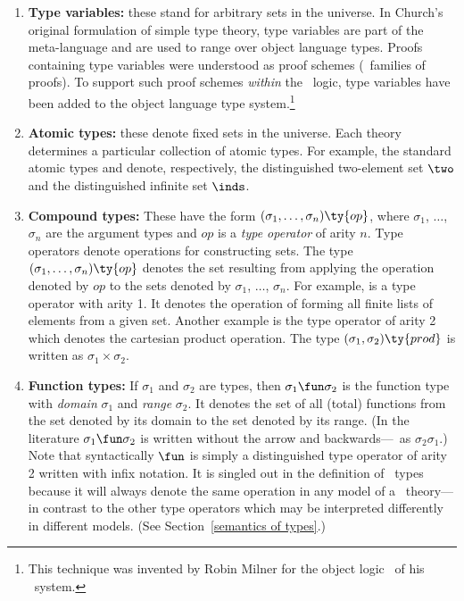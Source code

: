 \begin{enumerate}

\item {\bf Type variables:} these stand for arbitrary
sets in the universe.  In Church's original formulation of simple type
theory, type variables are part of the meta-language and are used to
range over object language types.  Proofs containing type variables
were understood as proof schemes (\ie\ families of proofs). To support
such proof schemes {\it within} the \HOL\ logic, type variables have
been added to the object language type system.\footnote{This technique
was invented by Robin Milner for the object logic \PPL\ of his \LCF\
system.}

\item {\bf Atomic types:} these denote fixed sets in the universe. Each
theory determines a particular collection of atomic types.  For
example, the standard atomic types  and  denote,
respectively, the distinguished two-element set $\two$ and the
distinguished infinite set $\inds$.

\item {\bf Compound types:} These have the
form $(\sigma_1,\ldots,\sigma_n)\ty{op}$, where $\sigma_1$, $\dots$,
$\sigma_n$ are the argument types and $op$ is a {\it type operator\/}
of arity $n$.  Type operators denote operations for constructing sets.
The type $(\sigma_1,\ldots,\sigma_n)\ty{op}$ denotes the set resulting
from applying the operation denoted by $op$ to the sets denoted by
$\sigma_1$, $\dots$, $\sigma_n$.  For example,
 is a type operator with arity 1.  It denotes the operation
of forming all finite lists of elements from a given set.  Another
example is the type operator \ty{prod} of arity 2 which denotes the
cartesian product operation.  The type $(\sigma_1,\sigma_2)\ty{prod}$
is written as $\sigma_1\times\sigma_2$.  

\item {\bf Function types:} If $\sigma_1$
and $\sigma_2$ are types, then $\sigma_1\fun\sigma_2$ is the function
type with {\it domain\/} $\sigma_1$ and {\it range} $\sigma_2$. It
denotes the set of all (total) functions from the set denoted by its
domain to the set denoted by its range. (In the literature
$\sigma_1\fun\sigma_2$ is written without the arrow and
backwards---\ie\ as $\sigma_2\sigma_1$.) Note that syntactically
$\fun$ is simply a distinguished type operator of arity 2 written with
infix notation. It is singled out in the definition of \HOL\ types
because it will always denote the same operation in any
model of a \HOL\ theory---in contrast to the other type operators which
may be interpreted differently in different models. (See
Section~\ref{semantics of types}.)


\end{enumerate}

